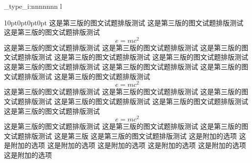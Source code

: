 \documentclass[a4paper,fontset = windowsnew]{ctexbook}
\begin{document}
    \cexam_type_i:nnnnnnn 
    {l}
      {
      }
      {10pt}{0pt}{0pt}{0pt}
      {
	这是第三版的图文试题排版测试
	这是第三版的图文试题排版测试
	这是第三版的图文试题排版测试
	\begin{equation}
	  e=mc^2
	\end{equation}
	这是第三版的图文试题排版测试
	这是第三版的图文试题排版测试
	这是第三版的图文试题排版测试
	这是第三版的图文试题排版测试
	这是第三版的图文试题排版测试
	这是第三版的图文试题排版测试
	这是第三版的图文试题排版测试
	这是第三版的图文试题排版测试
	这是第三版的图文试题排版测试
	\begin{equation}
	  e=mc^2
	\end{equation}
	这是第三版的图文试题排版测试
	这是第三版的图文试题排版测试
	这是第三版的图文试题排版测试
	这是第三版的图文试题排版测试
	这是第三版的图文试题排版测试
	这是第三版的图文试题排版测试
	\begin{equation}
	  e=mc^2
	\end{equation}
	这是第三版的图文试题排版测试
	这是第三版的图文试题排版测试
	这是第三版的图文试题排版测试
	这是第三版
	这是第三版的图文试题排版测试
      }
      \newline
      这是附加的选项
      这是附加的选项
      这是附加的选项
      这是附加的选项
      这是附加的选项
      这是附加的选项
      这是附加的选项


    
\end{document}

